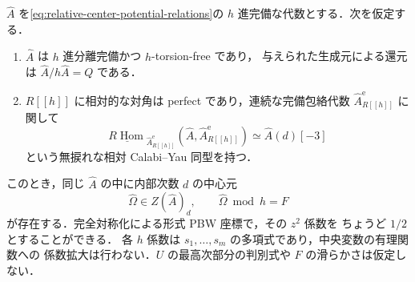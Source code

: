 \begin{lemma}
\label{lem:relative-formal-center-lift}
$\widehat A$ を\eqref{eq:relative-center-potential-relations}の
$h$ 進完備な代数とする．次を仮定する．
\begin{enumerate}
 \item $\widehat A$ は $h$ 進分離完備かつ $h$-torsion-free であり，
       与えられた生成元による還元は $\widehat A/h\widehat A=Q$ である．
 \item $R[[h]]$ に相対的な対角は perfect であり，連続な完備包絡代数
       $\widehat A^{\mathrm e}_{R[[h]]}$ に関して
       \[
        \underline{R\operatorname{Hom}}_{\widehat A^{\mathrm e}_{R[[h]]}}
          (\widehat A,\widehat A^{\mathrm e}_{R[[h]]})
          \simeq\widehat A(d)[-3]
       \]
       という無捩れな相対 Calabi--Yau 同型を持つ．
\end{enumerate}
このとき，同じ $\widehat A$ の中に内部次数 $d$ の中心元
\[
 \widehat\Omega\in Z(\widehat A)_d,\qquad
 \widehat\Omega\bmod h=F
\]
が存在する．完全対称化による形式 PBW 座標で，その $z^2$ 係数を
ちょうど $1/2$ とすることができる．
各 $h$ 係数は $s_1,\ldots,s_m$ の多項式であり，中央変数の有理関数への
係数拡大は行わない．$U$ の最高次部分の判別式や $F$ の滑らかさは仮定しない．
\end{lemma}

